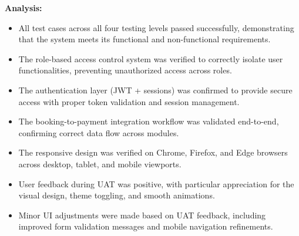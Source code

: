\textbf{Analysis:}
\begin{itemize}[leftmargin=2em]
    \item All test cases across all four testing levels passed successfully, demonstrating that the system meets its functional and non-functional requirements.
    \item The role-based access control system was verified to correctly isolate user functionalities, preventing unauthorized access across roles.
    \item The authentication layer (JWT + sessions) was confirmed to provide secure access with proper token validation and session management.
    \item The booking-to-payment integration workflow was validated end-to-end, confirming correct data flow across modules.
    \item The responsive design was verified on Chrome, Firefox, and Edge browsers across desktop, tablet, and mobile viewports.
    \item User feedback during UAT was positive, with particular appreciation for the visual design, theme toggling, and smooth animations.
    \item Minor UI adjustments were made based on UAT feedback, including improved form validation messages and mobile navigation refinements.
\end{itemize}
